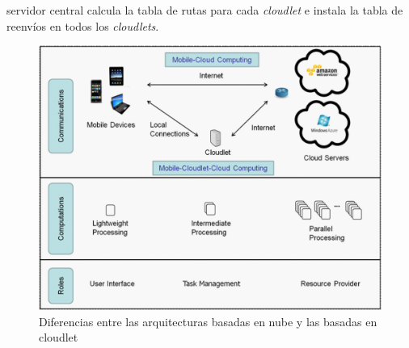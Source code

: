 servidor central calcula la tabla de rutas para cada \textit{cloudlet} e instala la tabla de reenvíos en todos los \textit{cloudlets}.
\begin{figure}[h]
  \centering
 \includegraphics[scale=0.20]{Figures/mccarchitecturevscloudlet}
 \centering \caption{Diferencias entre las arquitecturas basadas en nube y las basadas en cloudlet \cite{soyata2013accelerating}}
 \label{fig:mccarchitecturevscloudlet}
\end{figure}

